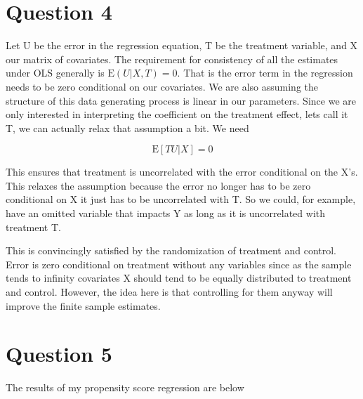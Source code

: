 \documentclass[11pt]{article}
\newcommand{\E}{\mathrm{E}}
\begin{document}
\section{ Question 4}

Let U be the error in the regression equation, T be the treatment variable, and X our matrix of covariates. The requirement for consistency of all the estimates under OLS generally is $ \E(U|X, T)=0$. That is the error term in the regression needs to be zero conditional on our covariates. We are also assuming the structure of this data generating process is linear in our parameters. Since we are only interested in interpreting the coefficient on the treatment effect, lets call it T, we can actually relax that assumption a bit. We need 

$$ \E[TU|X] = 0$$

This ensures that treatment is uncorrelated with the error conditional on the X's. This relaxes the assumption because the error no longer has to be zero conditional on X it just has to be uncorrelated with T. So we could, for example, have an omitted variable that impacts Y as long as it is uncorrelated with treatment T. 
\par


This is convincingly satisfied by the randomization of treatment and control. Error is zero conditional on treatment without any variables since as the sample tends to infinity covariates X should tend to be equally distributed to treatment and control. However, the idea here is that controlling for them anyway will improve the finite sample estimates.

\section{ Question 5}

The results of my propensity score regression are below
\begin{center}
	
	
	
\end{center}


\end{document}
